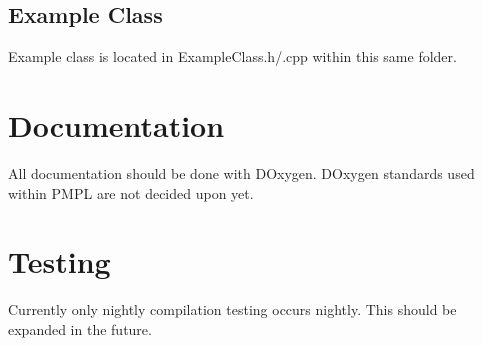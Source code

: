 \documentclass[12pt]{article}
\begin{document}
\subsection{Example Class}
Example class is located in ExampleClass.h/.cpp within this same folder.

\section{Documentation}
All documentation should be done with DOxygen. DOxygen standards used within PMPL are not decided upon yet.

\section{Testing}
Currently only nightly compilation testing occurs nightly. This should be expanded in the future.
\end{document}
